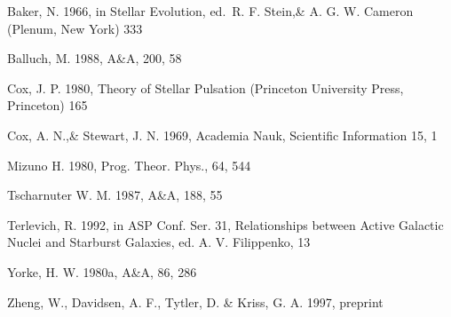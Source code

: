 \documentclass{aa}
\begin{document}
%
%

\begin{thebibliography}{}

   Baker, N. 1966,
      in Stellar Evolution,
      ed.\ R. F. Stein,\& A. G. W. Cameron
      (Plenum, New York) 333

    Balluch, M. 1988,
      A\&A, 200, 58

    Cox, J. P. 1980,
      Theory of Stellar Pulsation
      (Princeton University Press, Princeton) 165

    Cox, A. N.,\& Stewart, J. N. 1969,
      Academia Nauk, Scientific Information 15, 1

    Mizuno H. 1980,
      Prog. Theor. Phys., 64, 544
   
    Tscharnuter W. M. 1987,
      A\&A, 188, 55
  
    Terlevich, R. 1992, in ASP Conf. Ser. 31, 
      Relationships between Active Galactic Nuclei and Starburst Galaxies, 
      ed. A. V. Filippenko, 13

    Yorke, H. W. 1980a,
      A\&A, 86, 286

    Zheng, W., Davidsen, A. F., Tytler, D. \& Kriss, G. A.
      1997, preprint
\end{thebibliography}


\end{document}

